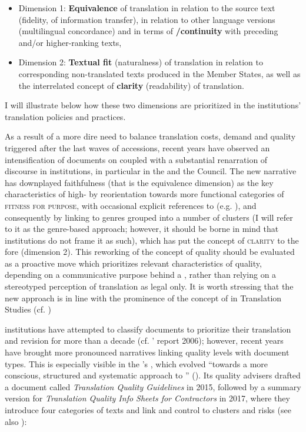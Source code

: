 \documentclass[output=paper]{langsci/langscibook}
\begin{document}
\begin{itemize}
\item 
Dimension 1: \textbf{Equivalence} of translation in relation to the source text (fidelity,  of information transfer), in relation to other language versions (multilingual concordance) and in terms of \textbf{/continuity} with preceding and/or higher-ranking texts,
\item 
Dimension 2: \textbf{Textual fit} (naturalness) of translation in relation to corresponding non-translated texts produced in the Member States, as well as the interrelated concept of \textbf{clarity} (readability) of translation.
\end{itemize}

I will illustrate below how these two dimensions are prioritized in the  institutions’ translation policies and practices.

As a result of a more dire need to balance translation costs, demand and quality triggered after the last waves of accessions, recent years have observed an intensification of documents on  coupled with a substantial renarration of  discourse in  institutions, in particular in the  and the Council. The new narrative has downplayed faithfulness (that is the equivalence dimension) as the key characteristics of high- by reorientation towards more functional categories of \textsc{fitness for purpose}, with occasional explicit references to \citeauthor{ISO2015} (e.g. \citealt[3]{DGT2015j}), and consequently by linking  to genres grouped into a number of clusters (I will refer to it as the genre-based approach; however, it should be borne in mind that  institutions do not frame it as such), which has put the concept of \textsc{clarity} to the fore (dimension 2). This reworking of the concept of quality should be evaluated as a proactive move which prioritizes relevant characteristics of quality, depending on a communicative purpose behind a , rather than relying on a stereotyped perception of  translation as legal only. It is worth stressing that the new approach is in line with the prominence of the concept of  in Translation Studies (cf. \citealt{Biel2017}) %

 institutions have attempted to classify documents to prioritize their translation and revision for more than a decade (cf. \citeauthor{EuropeanCourt2006}’ report 2006); however, recent years have brought more pronounced narratives linking quality levels with document types. This is especially visible in the ’s \citeauthor{DGT2015j}, which evolved “towards a more conscious, structured and systematic approach to ” (\citet[52]{Strandvik2017}). Its quality advisers drafted a document called \textit{ Translation Quality Guidelines} in 2015, followed by a summary version for  \textit{Translation Quality Info Sheets for Contractors} in 2017, where they introduce four categories of texts and link  and control to  clusters and risks (see also \citealt{Strandvik2017}):
\end{document}
